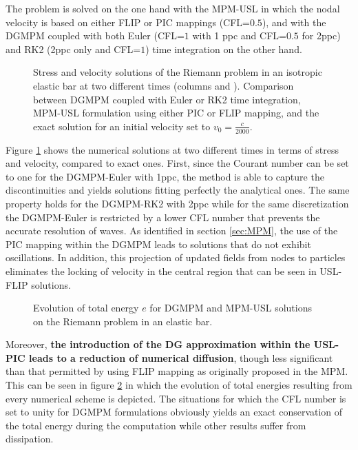 The problem is solved on the one hand with the MPM-USL in which the nodal velocity is based on either FLIP or PIC mappings (CFL=$0.5$), and with the DGMPM coupled with both Euler (CFL=$1$ with 1 ppc and CFL=$0.5$ for 2ppc) and RK2 (2ppc only and CFL=$1$) time integration on the other hand.
\begin{figure}[h!]
  \centering
  { \label{subfig:rp_elastic1}}
  { \label{subfig:rp_elastic2}}
  
  \caption{Stress and velocity solutions of the Riemann problem in an isotropic elastic bar at two different times (columns  and ). Comparison between DGMPM coupled with Euler or RK2 time integration, MPM-USL formulation using either PIC or FLIP mapping, and the exact solution for an initial velocity set to $v_0=\frac{c}{2000}$.}
  \label{fig:elastic_stress}
\end{figure}
Figure \ref{fig:elastic_stress} shows the numerical solutions at two different times in terms of stress and velocity, compared to exact ones. 
First, since the Courant number can be set to one for the DGMPM-Euler with 1ppc, the method is able to capture the discontinuities and yields solutions fitting perfectly the analytical ones. The same property holds for the DGMPM-RK2 with 2ppc while for the same discretization the DGMPM-Euler is restricted by a lower CFL number that prevents the accurate resolution of waves.
As identified in section \ref{sec:MPM}, the use of the PIC mapping within the DGMPM leads to solutions that do not exhibit oscillations.
In addition, this projection of updated fields from nodes to particles eliminates the locking of velocity in the central region that can be seen in USL-FLIP solutions.
\begin{figure}[h!]
  \centering
  
  \caption{Evolution of total energy $e$ for DGMPM and MPM-USL solutions on the Riemann problem in an elastic bar.}
  \label{fig:energy_elastic_RP}
\end{figure}
Moreover, \textbf{the introduction of the DG approximation within the USL-PIC leads to a reduction of numerical diffusion}, though less significant than that permitted by using FLIP mapping as originally proposed in the MPM.
This can be seen in figure \ref{fig:energy_elastic_RP} in which the evolution of total energies resulting from every numerical scheme is depicted.
The situations for which the CFL number is set to unity for DGMPM formulations obviously yields an exact conservation of the total energy during the computation while other results suffer from dissipation.

